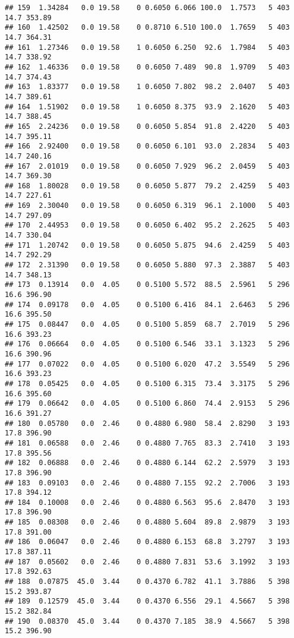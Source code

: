\documentclass[
]{article}
\begin{document}
\begin{verbatim}
## 159  1.34284   0.0 19.58    0 0.6050 6.066 100.0  1.7573   5 403    14.7 353.89
## 160  1.42502   0.0 19.58    0 0.8710 6.510 100.0  1.7659   5 403    14.7 364.31
## 161  1.27346   0.0 19.58    1 0.6050 6.250  92.6  1.7984   5 403    14.7 338.92
## 162  1.46336   0.0 19.58    0 0.6050 7.489  90.8  1.9709   5 403    14.7 374.43
## 163  1.83377   0.0 19.58    1 0.6050 7.802  98.2  2.0407   5 403    14.7 389.61
## 164  1.51902   0.0 19.58    1 0.6050 8.375  93.9  2.1620   5 403    14.7 388.45
## 165  2.24236   0.0 19.58    0 0.6050 5.854  91.8  2.4220   5 403    14.7 395.11
## 166  2.92400   0.0 19.58    0 0.6050 6.101  93.0  2.2834   5 403    14.7 240.16
## 167  2.01019   0.0 19.58    0 0.6050 7.929  96.2  2.0459   5 403    14.7 369.30
## 168  1.80028   0.0 19.58    0 0.6050 5.877  79.2  2.4259   5 403    14.7 227.61
## 169  2.30040   0.0 19.58    0 0.6050 6.319  96.1  2.1000   5 403    14.7 297.09
## 170  2.44953   0.0 19.58    0 0.6050 6.402  95.2  2.2625   5 403    14.7 330.04
## 171  1.20742   0.0 19.58    0 0.6050 5.875  94.6  2.4259   5 403    14.7 292.29
## 172  2.31390   0.0 19.58    0 0.6050 5.880  97.3  2.3887   5 403    14.7 348.13
## 173  0.13914   0.0  4.05    0 0.5100 5.572  88.5  2.5961   5 296    16.6 396.90
## 174  0.09178   0.0  4.05    0 0.5100 6.416  84.1  2.6463   5 296    16.6 395.50
## 175  0.08447   0.0  4.05    0 0.5100 5.859  68.7  2.7019   5 296    16.6 393.23
## 176  0.06664   0.0  4.05    0 0.5100 6.546  33.1  3.1323   5 296    16.6 390.96
## 177  0.07022   0.0  4.05    0 0.5100 6.020  47.2  3.5549   5 296    16.6 393.23
## 178  0.05425   0.0  4.05    0 0.5100 6.315  73.4  3.3175   5 296    16.6 395.60
## 179  0.06642   0.0  4.05    0 0.5100 6.860  74.4  2.9153   5 296    16.6 391.27
## 180  0.05780   0.0  2.46    0 0.4880 6.980  58.4  2.8290   3 193    17.8 396.90
## 181  0.06588   0.0  2.46    0 0.4880 7.765  83.3  2.7410   3 193    17.8 395.56
## 182  0.06888   0.0  2.46    0 0.4880 6.144  62.2  2.5979   3 193    17.8 396.90
## 183  0.09103   0.0  2.46    0 0.4880 7.155  92.2  2.7006   3 193    17.8 394.12
## 184  0.10008   0.0  2.46    0 0.4880 6.563  95.6  2.8470   3 193    17.8 396.90
## 185  0.08308   0.0  2.46    0 0.4880 5.604  89.8  2.9879   3 193    17.8 391.00
## 186  0.06047   0.0  2.46    0 0.4880 6.153  68.8  3.2797   3 193    17.8 387.11
## 187  0.05602   0.0  2.46    0 0.4880 7.831  53.6  3.1992   3 193    17.8 392.63
## 188  0.07875  45.0  3.44    0 0.4370 6.782  41.1  3.7886   5 398    15.2 393.87
## 189  0.12579  45.0  3.44    0 0.4370 6.556  29.1  4.5667   5 398    15.2 382.84
## 190  0.08370  45.0  3.44    0 0.4370 7.185  38.9  4.5667   5 398    15.2 396.90

\end{verbatim}
\end{document}
